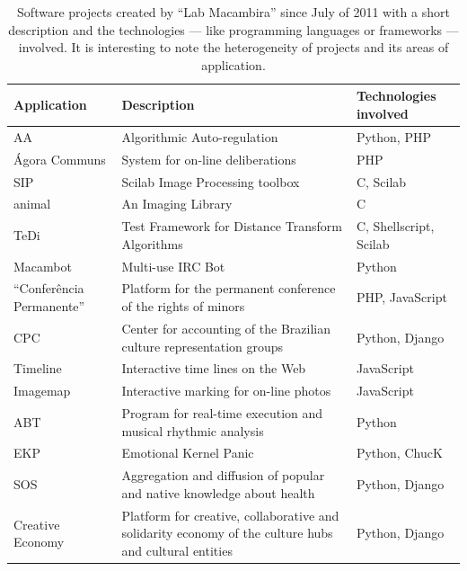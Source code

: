 \documentclass[letterpaper]{article}
\begin{document}
\begin{table}
    \caption{Software projects created by ``Lab Macambira'' since July
      of 2011 with a short description and the technologies --- like
      programming languages or frameworks --- involved. It is
      interesting to note the heterogeneity of projects and its areas
      of application.}
    \small\begin{tabular}{|l|p{5cm}|l|}
        \hline
        Application & Description & Technologies involved \\ 
        \hline \hline
        AA            & Algorithmic Auto-regulation      & Python, PHP \\
        \hline
        \'{A}gora Communs & System for on-line deliberations & PHP \\
        \hline
        SIP           & Scilab Image Processing toolbox & C, Scilab \\
        \hline
        animal        & An Imaging Library              & C \\
        \hline
        TeDi          & Test Framework for Distance Transform
        Algorithms & C, Shellscript, Scilab \\
        \hline
        Macambot      & Multi-use IRC Bot               & Python \\
        \hline
        ``Confer\^{e}ncia Permanente'' & Platform for the permanent
        conference of the rights of minors & PHP, JavaScript \\
        \hline
        CPC           & Center for accounting of the Brazilian culture
        representation groups & Python, Django \\
        \hline
        Timeline      & Interactive time lines on the Web & JavaScript
        \\
        \hline
        Imagemap      & Interactive marking for on-line photos &
        JavaScript \\
        \hline
        ABT           & Program for real-time execution and musical
        rhythmic analysis & Python \\
        \hline
        EKP           & Emotional Kernel Panic & Python, ChucK \\
        \hline
        SOS           & Aggregation and diffusion of popular and native
        knowledge about health & Python, Django \\
        \hline
        Creative Economy & Platform for creative, collaborative and
        solidarity economy of the culture hubs and cultural entities &
        Python, Django \\

\end{tabular}
\end{table}
\end{document}
